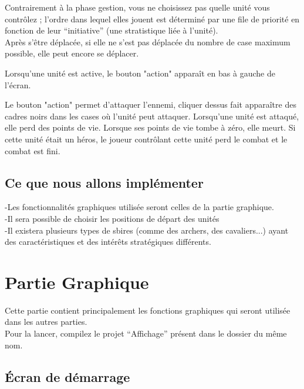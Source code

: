 \documentclass[11pt,a4paper]{article}
\begin{document}
Contrairement à la phase gestion, vous ne choisissez pas quelle unité vous contrôlez ; l'ordre dans lequel elles jouent est déterminé par une file de priorité en fonction de leur ``initiative'' (une stratistique liée à l'unité).\\

Après s'être déplacée, si elle ne s'est pas déplacée du nombre de case maximum possible, elle peut encore se déplacer.

Lorsqu'une unité est active, le bouton "action" apparaît en bas à gauche de l'écran.

Le bouton "action" permet d'attaquer l'ennemi, cliquer dessus fait apparaître des cadres noirs dans les cases où l'unité peut attaquer. Lorsqu'une unité est attaqué, elle perd des points de vie. Lorsque ses points de vie tombe à zéro, elle meurt. Si cette unité était un héros, le joueur contrôlant cette unité perd le combat et le combat est fini.

\subsection{Ce que nous allons implémenter}

-Les fonctionnalités graphiques utilisée seront celles de la partie graphique. \\
-Il sera possible de choisir les positions de départ des unités \\
-Il existera plusieurs types de sbires (comme des archers, des cavaliers...) ayant des caractéristiques et des intérêts stratégiques différents.

\clearpage

\section{Partie Graphique}

Cette partie contient principalement les fonctions graphiques qui seront utilisée dans les autres parties. \\
Pour la lancer, compilez le projet ``Affichage'' présent dans le dossier du même nom.

\subsection{Écran de démarrage}
\end{document}
